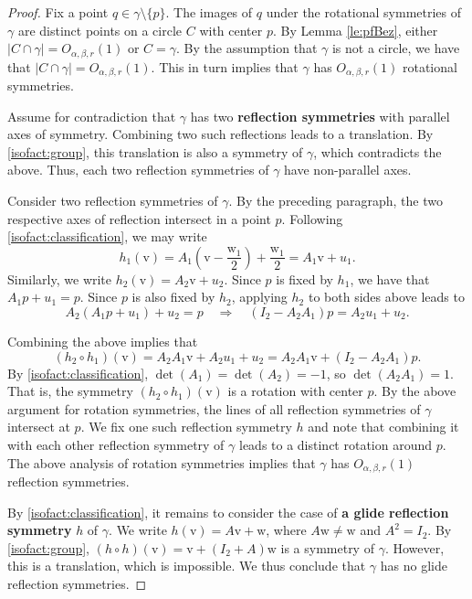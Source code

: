 \documentclass[11pt]{article}
\theoremstyle{definition}
\newcommand*{\vecw}{\mathrm{w}}
\newcommand*{\vecv}{\mathrm{v}}
\begin{document}
\begin{proof}
Fix a point $q\in \gamma\setminus\{p\}$.  The images of $q$ under the rotational symmetries of $\gamma$ are distinct points on a circle $C$ with center $p$.
By Lemma \ref{le:pfBez}, either $|C \cap \gamma|=O_{\alpha,\beta,r}(1)$ or $C=\gamma$.
By the assumption that $\gamma$ is not a circle, we have that $|C \cap \gamma|=O_{\alpha,\beta,r}(1)$.
This in turn implies that $\gamma$ has $O_{\alpha,\beta,r}(1)$ rotational symmetries. 

Assume for contradiction that $\gamma$ has two {\bf reflection symmetries} with parallel axes of symmetry. 
Combining two such reflections leads to a translation. 
By \ref{isofact:group}, this translation is also a symmetry of $\gamma$, which contradicts the above.
Thus, each two reflection symmetries of $\gamma$ have non-parallel axes.

Consider two reflection symmetries of $\gamma$.
By the preceding paragraph, the two respective axes of reflection intersect in a point $p$. 
Following \ref{isofact:classification}, we may write
%
\[ h_1(\vecv) = A_1\left(\vecv - \frac{\vecw_1}{2}\right) + \frac{\vecw_1}{2} = A_1\vecv + u_1.  \]
Similarly, we write $h_2(\vecv) = A_2\vecv + u_2$.
Since $p$ is fixed by $h_1$, we have that $A_1 p + u_1 = p$.
Since $p$ is also fixed by $h_2$, applying $h_2$ to both sides above leads to
%
\begin{equation*} %
A_2(A_1 p + u_1) + u_2 = p \quad \Rightarrow \quad (I_2-A_2A_1)p = A_2 u_1 + u_2.  
\end{equation*}

Combining the above implies that
%
\[ (h_2 \circ h_1)(\vecv) = A_2A_1\vecv + A_2u_1 + u_2 = A_2A_1\vecv + (I_2 - A_2A_1)p. \]
%
By \ref{isofact:classification}, $\det(A_1)=\det(A_2)=-1$, so $\det(A_2A_1)=1$.
That is, the symmetry $(h_2 \circ h_1)(\vecv)$ is a rotation with center $p$.
By the above argument for rotation symmetries, the lines of all reflection symmetries of $\gamma$ intersect at $p$.
We fix one such reflection symmetry $h$ and note that combining it with each other reflection symmetry of $\gamma$ leads to a distinct rotation around $p$.
The above analysis of rotation symmetries implies that $\gamma$ has $O_{\alpha,\beta,r}(1)$ reflection symmetries. 

By \ref{isofact:classification}, it remains to consider the case of {\bf a glide reflection symmetry} $h$ of $\gamma$.
We write $h(\vecv) = A\vecv + \vecw$, where  $A\vecw \neq \vecw$ and $A^2=I_2$.
By \ref{isofact:group}, $(h \circ h)(\vecv) = \vecv + (I_2 + A)\vecw$ is a symmetry of $\gamma$.
However, this is a translation, which is impossible. 
We thus conclude that $\gamma$ has no glide reflection symmetries.
%
\end{proof}
\end{document}
